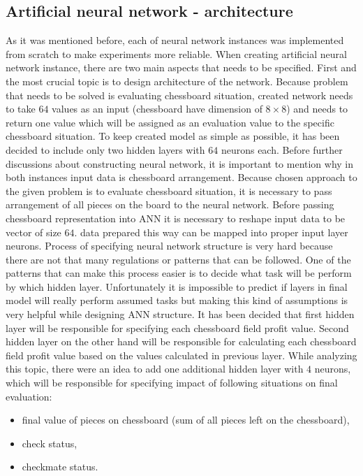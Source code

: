 \subsection{Artificial neural network - architecture}\label{sec:ann-architecture}
As it was mentioned before, each of neural network instances was implemented from scratch to make experiments more reliable. When creating artificial neural network instance, there are two main aspects that needs to be specified. First and the most crucial topic is to design architecture of the network. Because problem that needs to be solved is evaluating chessboard situation, created network needs to take $64$ values as an input (chessboard have dimension of $8 \times 8$) and needs to return one value which will be assigned as an evaluation value to the specific chessboard situation. To keep created model as simple as possible, it has been decided to include only two hidden layers with $64$ neurons each. Before further discussions about constructing neural network, it is important to mention why in both instances input data is chessboard arrangement. Because chosen approach to the given problem is to evaluate chessboard situation, it is necessary to pass arrangement of all pieces on the board to the neural network. Before passing chessboard representation into ANN it is necessary to reshape input data to be vector of size $64$. data prepared this way can be mapped into proper input layer neurons. Process of specifying neural network structure is very hard because there are not that many regulations or patterns that can be followed. One of the patterns that can make this process easier is to decide what task will be perform by which hidden layer. Unfortunately it is impossible to predict if layers in final model will really perform assumed tasks but making this kind of assumptions is very helpful while designing ANN structure. It has been decided that first hidden layer will be responsible for specifying each chessboard field profit value. Second hidden layer on the other hand will be responsible for calculating each chessboard field profit value based on the values calculated in previous layer. While analyzing this topic, there were an idea to add one additional hidden layer with $4$ neurons, which will be responsible for specifying impact of following situations on final evaluation: 
\begin{itemize}
	\item final value of pieces on chessboard (sum of all pieces left on the chessboard),
	\item check status,
	\item checkmate status.
\end{itemize}
